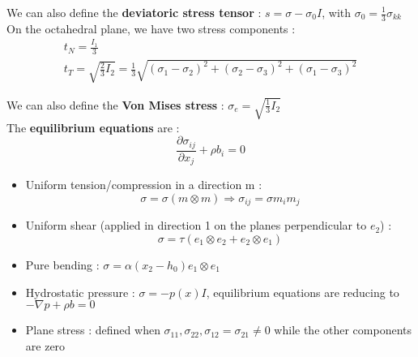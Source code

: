\documentclass[../main.tex]{subfiles}
\begin{document}
We can also define the \textbf{deviatoric stress tensor} : $s = \sigma-\sigma_0 I$, with $\sigma_0 = \frac{1}{3}\sigma_{kk}$\\

On the octahedral plane, we have two stress components : \begin{equation}
\begin{gathered}
t_N = \frac{I_1}{3}\\
t_T = \sqrt{\frac{2}{3} I_2} = \frac{1}{3}\sqrt{(\sigma_1-\sigma_2)^2 + (\sigma_2-\sigma_3)^2 + (\sigma_1-\sigma_3)^2}
\end{gathered}
\end{equation}

We can also define the \textbf{Von Mises stress} : $\sigma_e = \sqrt{\frac{1}{3} I_2}$\\

The \textbf{equilibrium equations} are : \begin{equation}
    \frac{\partial \sigma_{ij}}{\partial x_j} + \rho b_i = 0
\end{equation}

\begin{itemize}
    \item Uniform tension/compression in a direction m : \begin{equation}
        \sigma = \sigma(m\otimes m) \Rightarrow \sigma_{ij} = \sigma m_im_j
    \end{equation}
    \item Uniform shear (applied in direction 1 on the planes perpendicular to $e_2$) : \begin{equation}
        \sigma = \tau( e_1 \otimes e_2 + e_2\otimes e_1)
    \end{equation}
    \item Pure bending : $\sigma = \alpha(x_2 - h_0) e_1 \otimes e_1$\\
    \item Hydrostatic pressure : $\sigma = -p(x)I$, equilibrium equations are reducing to $-\nabla p + \rho b = 0$\\
    \item Plane stress : defined when $\sigma_{11}, \sigma_{22}, \sigma_{12} = \sigma_{21} \neq 0$ while the other components are zero\\
\end{itemize}
\end{document}
